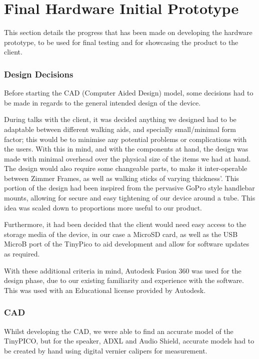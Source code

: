 {\section{Final Hardware Initial Prototype}
\label{sec:cad}

This section details the progress that has been made on developing the hardware prototype, to be used for final testing and for showcasing the product to the client.

\subsubsection{Design Decisions}

Before starting the CAD (Computer Aided Design) model, some decisions had to be made in regards to the general intended design of the device.

During talks with the client, it was decided anything we designed had to be adaptable between different walking aids, and specially small/minimal form factor; this would be to minimise any potential problems or complications with the users. With this in mind, and with the components at hand, the design was made with minimal overhead over the physical size of the items we had at hand. The design would also require some changeable parts, to make it inter-operable between Zimmer Frames, as well as walking sticks of varying thickness'. This portion of the design had been inspired from the pervasive GoPro style handlebar mounts, allowing for secure and easy tightening of our device around a tube. This idea was scaled down to proportions more useful to our product.

Furthermore, it had been decided that the client would need easy access to the storage media of the device, in our case a MicroSD card, as well as the USB MicroB port of the TinyPico to aid development and allow for software updates as required.

With these additional criteria in mind, Autodesk Fusion 360 was used for the design phase, due to our existing  familiarity and experience with the software. This was used with an Educational license provided by Autodesk.

\subsubsection{CAD}

Whilst developing the CAD, we were able to find an accurate model of the TinyPICO, but for the speaker, ADXL and Audio Shield, accurate models had to be created by hand using digital vernier calipers for measurement. 

}
